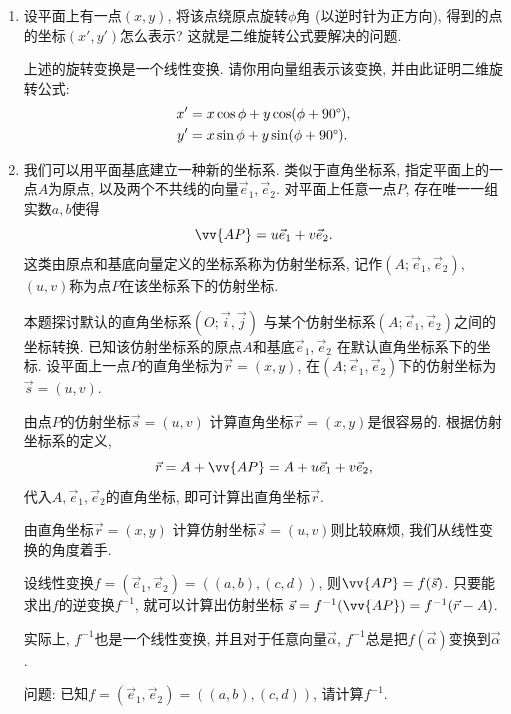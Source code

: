 \begin{enumerate}
  \item {}
        设平面上有一点$(x,y)$, 将该点绕原点旋转$\phi$角
        (以逆时针为正方向), 得到的点的坐标$(x',y')$怎么表示?
        这就是二维旋转公式要解决的问题.

        上述的旋转变换是一个线性变换.
        请你用向量组表示该变换, 并由此证明二维旋转公式:
        \begin{align*}
          x' & = x\cos\phi + y\cos(\phi+90\degree), \\
          y' & = x\sin\phi + y\sin(\phi+90\degree).
        \end{align*}
  \item {}
        我们可以用平面基底建立一种新的坐标系.
        类似于直角坐标系, 指定平面上的一点$A$为原点,
        以及两个不共线的向量$\vec e_1,\vec e_2$.
        对平面上任意一点$P$, 存在唯一一组实数$a,b$使得
        \[
          \vv{AP} = u\vec e_1 + v\vec e_2.
        \]
        这类由原点和基底向量定义的坐标系称为仿射坐标系,
        记作$(A;\vec e_1,\vec e_2)$,
        $(u,v)$称为点$P$在该坐标系下的仿射坐标.

        本题探讨默认的直角坐标系$(O;\vec i,\vec j)$
        与某个仿射坐标系$(A;\vec e_1,\vec e_2)$之间的坐标转换.
        已知该仿射坐标系的原点$A$和基底$\vec e_1,\vec e_2$
        在默认直角坐标系下的坐标.
        设平面上一点$P$的直角坐标为$\vec r=(x,y)$,
        在$(A;\vec e_1,\vec e_2)$下的仿射坐标为$\vec s=(u,v)$.

        由点$P$的仿射坐标$\vec s=(u,v)$
        计算直角坐标$\vec r=(x,y)$是很容易的.
        根据仿射坐标系的定义,
        \[
          \vec r = A + \vv{AP} = A + u\vec e_1 + v\vec e_2,
        \]
        代入$A,\vec e_1,\vec e_2$的直角坐标,
        即可计算出直角坐标$\vec r$.

        由直角坐标$\vec r=(x,y)$
        计算仿射坐标$\vec s=(u,v)$则比较麻烦,
        我们从线性变换的角度着手.

        设线性变换$f = (\vec e_1,\vec e_2) = ((a,b),(c,d))$,
        则$\vv{AP} = f(\vec s)$.
        只要能求出$f$的逆变换$f^{-1}$, 就可以计算出仿射坐标
        $\vec s = f^{-1}(\vv{AP}) = f^{-1}(\vec r - A)$.

        实际上, $f^{-1}$也是一个线性变换, 并且对于任意向量$\vec\alpha$,
        $f^{-1}$总是把$f(\vec\alpha)$变换到$\vec\alpha$.

        问题: 已知$f=(\vec e_1,\vec e_2)=((a,b),(c,d))$,
        请计算$f^{-1}$.
\end{enumerate}
